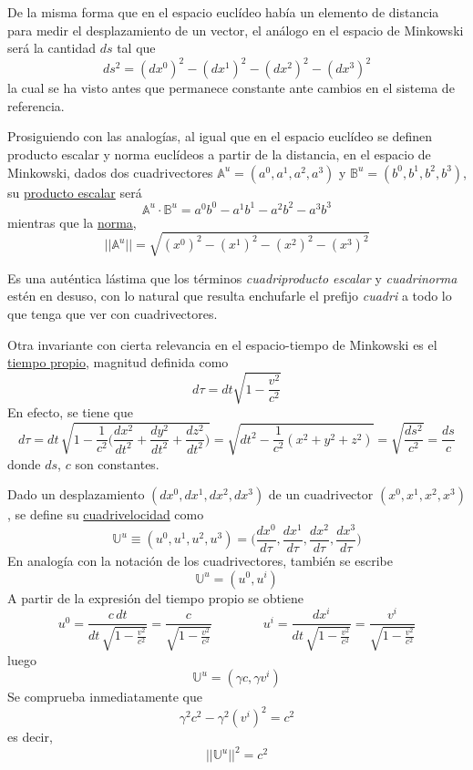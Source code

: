 \documentclass[12pt]{report}
\begin{document}
\vspace{2mm}
De la misma forma que en el espacio euclídeo había un elemento de distancia para medir el desplazamiento de un vector, el análogo en el espacio de Minkowski será la cantidad $ds$ tal que
\[ds^2 = (dx^0)^2 - (dx^1)^2 - (dx^2)^2 - (dx^3)^2\]
la cual se ha visto antes que permanece constante ante cambios en el sistema de referencia. 

\vspace{2mm}
Prosiguiendo con las analogías, al igual que en el espacio euclídeo se definen producto escalar y norma euclídeos a partir de la distancia, en el espacio de Minkowski, dados dos cuadrivectores $\mathbb{A}^u = (a^0,a^1,a^2,a^3)$ y $\mathbb{B}^u = (b^0,b^1,b^2,b^3)$, su \ul{producto escalar} será
\[\mathbb{A}^u \cdot \mathbb{B}^u = a^0b^0 - a^1b^1-a^2b^2-a^3b^3\]
mientras que la \ul{norma},
\[||\mathbb{A}^u|| = \sqrt{(x^0)^2-(x^1)^2-(x^2)^2-(x^3)^2}\]

\vspace{2mm}
Es una auténtica lástima que los términos \textit{cuadriproducto escalar} y \textit{cuadrinorma} estén en desuso, con lo natural que resulta enchufarle el prefijo \textit{cuadri} a todo lo que tenga que ver con cuadrivectores.

\vspace{2mm}
Otra invariante con cierta relevancia en el espacio-tiempo de Minkowski es el \ul{tiempo propio}, magnitud definida como
\[d\tau = dt \sqrt{1 - \frac{v^2}{c^2}}\]
En efecto, se tiene que
\[d\tau = dt \, \sqrt{1 - \frac{1}{c^2}\biggl(\frac{dx^2}{dt^2}+\frac{dy^2}{dt^2}+\frac{dz^2}{dt^2}\biggr)} = \sqrt{dt^2 - \frac{1}{c^2}(x^2+y^2+z^2)} = \sqrt{\frac{ds^2}{c^2}} = \frac{ds}{c}\]
donde $ds$, $c$ son constantes. 

\vspace{2mm}
Dado un desplazamiento $(dx^0,dx^1,dx^2,dx^3)$ de un cuadrivector $(x^0,x^1,x^2,x^3)$, se define su \ul{cuadrivelocidad} como
\[\mathbb{U}^u \equiv (u^0, u^1, u^2, u^3) = \biggl( \frac{dx^0}{d\tau}, \frac{dx^1}{d\tau}, \frac{dx^2}{d\tau}, \frac{dx^3}{d\tau} \biggr)\]
En analogía con la notación de los cuadrivectores, también se escribe
\[\mathbb{U}^u = (u^0, u^i)\]
A partir de la expresión del tiempo propio se obtiene
\[ u^0 = \frac{c\, dt}{dt \, \sqrt{1-\frac{v^2}{c^2}}} = \frac{c}{\sqrt{1-\frac{v^2}{c^2}}} \qquad \qquad  u^i = \frac{dx^i}{dt \, \sqrt{1-\frac{v^2}{c^2}}} = \frac{v^i}{\sqrt{1-\frac{v^2}{c^2}}}\]
luego
\[\boxed{\mathbb{U}^u = (\gamma c,\gamma v^i)}\]
Se comprueba inmediatamente que
\[\gamma^2 c^2 - \gamma^2 (v^i)^2 = c^2\]
es decir,
\[\boxed{||\mathbb{U}^u||^2 = c^2}\]
\end{document}

